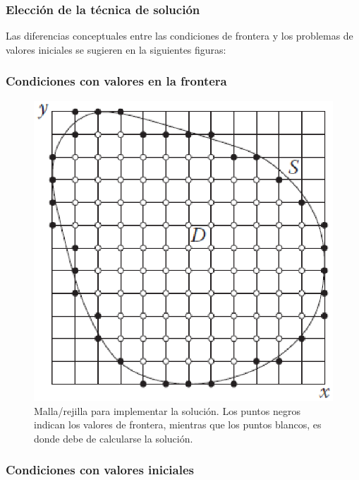 \begin{frame}
\frametitle{Elección de la técnica de solución}
Las diferencias conceptuales entre las condiciones de frontera y los problemas de valores iniciales se sugieren en la siguientes figuras:
\end{frame}
{
\begin{frame}
\captionsetup{font=scriptsize,labelfont=scriptsize}
\frametitle{Condiciones con valores en la frontera}
\begin{figure}
	\centering
	\includegraphics[scale=0.5]{Imagenes/condicionesEDP_01.eps}
	\caption{Malla/rejilla para implementar la solución. Los puntos negros indican los valores de frontera, mientras que los puntos blancos, es donde debe de calcularse la solución.}
\end{figure}
\end{frame}
\begin{frame}
\captionsetup{font=scriptsize,labelfont=scriptsize}
\frametitle{Condiciones con valores iniciales}
\begin{figure}
	\centering

\end{figure}
\end{frame}}
